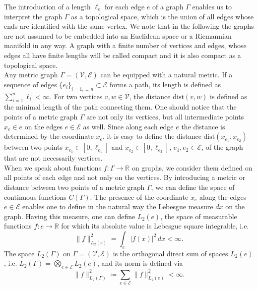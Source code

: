The introduction of a length $\ell_e$ for each edge $e$ of a graph $\Gamma$ enables us to interpret the graph $\Gamma$ as a topological space, which is the union of all edges whose ends are identified with the same vertex. We note that in the following the graphs are not assumed to be embedded into an Euclidean space or a Riemannian manifold in any way. A graph with a finite number of vertices and edges, whose edges all have finite lengths will be called compact and it is also compact as a topological space. \\
Any metric graph $\Gamma = (\mathcal{V}, \mathcal{E})$ can be equipped with a natural metric. If a sequence of edges $\{ e_i \}_{i = 1, \ldots, n} \subset \mathcal{E}$ forms a path, its length is defined as $\sum^{n}_{i=1} \ell_i < \infty$. For two vertices $v, w \in \mathcal{V}$, the distance $\mathrm{dist}(v,w)$ is defined as the minimal length of the path connecting them. One should notice that the points of a metric graph $\Gamma$ are not only its vertices, but all intermediate points $x_e \in e$ on the edges $e \in \mathcal{E}$ as well. Since along each edge $e$ the distance is determined by the coordinate $x_e$, it is easy to define the distance $\mathrm{dist}(x_{e_1},x_{e_2})$ between two points $x_{e_1} \in [0, \ell_{e_1}]$ and $x_{e_2} \in [0, \ell_{e_2}]$, $e_1, e_2 \in \mathcal{E}$, of the graph that are not necessarily vertices. \\
When we speak about functions $f \colon \Gamma \to \mathbb{R}$ on graphs, we consider them defined on all points of each edge and not only on the vertices. By introducing a metric or distance between two points of a metric graph $\Gamma$, we can define the space of continuous functions $C(\Gamma)$. The presence of the coordinate $x_e$ along the edges $e \in \mathcal{E}$ enables one to define in the natural way the Lebesgue measure $dx$ on the graph. Having this measure, one can define $L_2(e)$, the space of measurable functions $f \colon e \to \mathbb{R}$ for which its absolute value is Lebesgue square integrable, i.e.
\begin{equation*}
    \lVert f \rVert^{2}_{L_2(e)} = \int_e \lvert f(x) \rvert^2 \, dx < \infty.
\end{equation*}
The space $L_2(\Gamma)$ on $\Gamma = (\mathcal{V}, \mathcal{E})$ is the orthogonal direct sum of spaces $L_2(e)$, i.e. $L_2(\Gamma) = \bigotimes_{e \in \mathcal{E}} L_2(e)$, and its norm is defined via
\begin{equation*} 
    \lVert f \rVert^{2}_{L_2(\Gamma)} \coloneqq \sum_{e \in \mathcal{E}} \lVert f \rVert^{2}_{L_2(e)} < \infty.
\end{equation*} 
